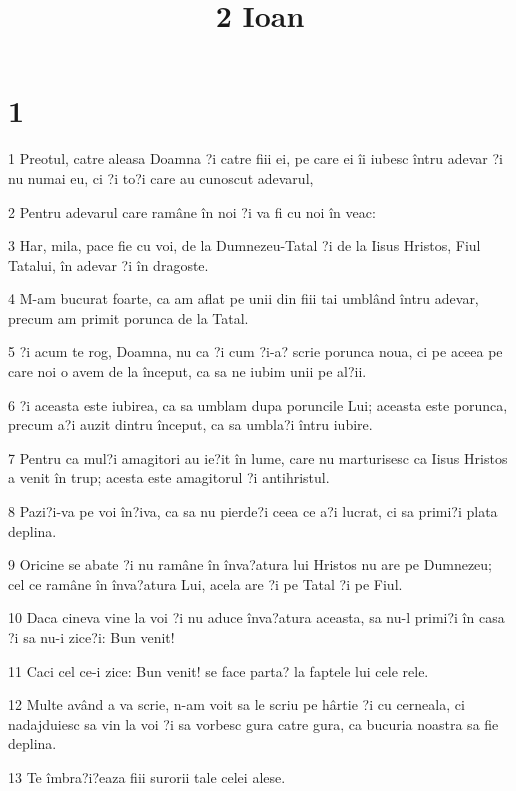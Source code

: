 

\title{2 Ioan}


\chapter{1}

\par 1 Preotul, catre aleasa Doamna ?i catre fiii ei, pe care ei îi iubesc întru adevar ?i nu numai eu, ci ?i to?i care au cunoscut adevarul,
\par 2 Pentru adevarul care ramâne în noi ?i va fi cu noi în veac:
\par 3 Har, mila, pace fie cu voi, de la Dumnezeu-Tatal ?i de la Iisus Hristos, Fiul Tatalui, în adevar ?i în dragoste.
\par 4 M-am bucurat foarte, ca am aflat pe unii din fiii tai umblând întru adevar, precum am primit porunca de la Tatal.
\par 5 ?i acum te rog, Doamna, nu ca ?i cum ?i-a? scrie porunca noua, ci pe aceea pe care noi o avem de la început, ca sa ne iubim unii pe al?ii.
\par 6 ?i aceasta este iubirea, ca sa umblam dupa poruncile Lui; aceasta este porunca, precum a?i auzit dintru început, ca sa umbla?i întru iubire.
\par 7 Pentru ca mul?i amagitori au ie?it în lume, care nu marturisesc ca Iisus Hristos a venit în trup; acesta este amagitorul ?i antihristul.
\par 8 Pazi?i-va pe voi în?iva, ca sa nu pierde?i ceea ce a?i lucrat, ci sa primi?i plata deplina.
\par 9 Oricine se abate ?i nu ramâne în înva?atura lui Hristos nu are pe Dumnezeu; cel ce ramâne în înva?atura Lui, acela are ?i pe Tatal ?i pe Fiul.
\par 10 Daca cineva vine la voi ?i nu aduce înva?atura aceasta, sa nu-l primi?i în casa ?i sa nu-i zice?i: Bun venit!
\par 11 Caci cel ce-i zice: Bun venit! se face parta? la faptele lui cele rele.
\par 12 Multe având a va scrie, n-am voit sa le scriu pe hârtie ?i cu cerneala, ci nadajduiesc sa vin la voi ?i sa vorbesc gura catre gura, ca bucuria noastra sa fie deplina.
\par 13 Te îmbra?i?eaza fiii surorii tale celei alese.


